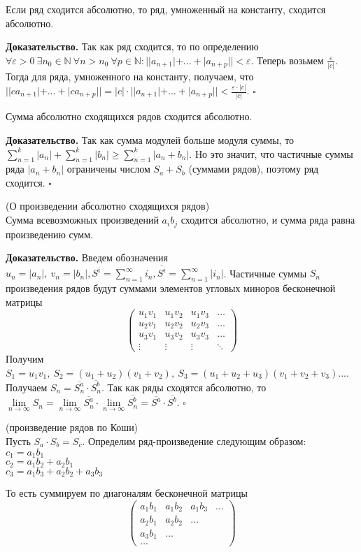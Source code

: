 \begin{theor}
Если ряд сходится абсолютно, то ряд, умноженный на константу, сходится 
абсолютно. 
\end{theor}
\textbf{Доказательство.} 
Так как ряд сходится, то по определению $\forall \varepsilon>0~\exists n_0\in
\mathbb{N}~\forall n>n_0~\forall p\in\mathbb{N}:| |a_{n+1}|+...+|a_{n+p}| |
<\varepsilon$. Теперь возьмем  $\frac{\varepsilon}{|c|}$. Тогда для ряда, 
умноженного на константу, получаем, что $| |ca_{n+1}|+...+|ca_{n+p}| |=
|c|\cdot | |a_{n+1}|+...+|a_{n+p}| |<\frac{\varepsilon\cdot|c|}{|c|}$.  
$\square$ 
\begin{theor}
Сумма абсолютно сходящихся рядов сходится абсолютно.
\end{theor}
\textbf{Доказательство.}  Так как сумма модулей больше модуля суммы, то
$\sum\limits_{n=1}^{k} |a_n|+\sum\limits_{n=1}^{k} |b_n|\geqslant
\sum\limits_{n=1}^{k} |a_n+b_n|$. Но это значит, что частичные суммы 
ряда $|a_n+b_n|$ ограничены числом $S_a+S_b$ (суммами рядов), поэтому ряд
сходится. $\square$ 
\begin{theor}
    (О произведении абсолютно сходящихся рядов)\\
    Сумма всевозможных произведений $a_ib_j$ сходится абсолютно, и сумма ряда
    равна произведению сумм.
\end{theor}
\textbf{Доказательство.} Введем обозначения
$u_n=|a_n|,~v_n=|b_n|,S^i=\sum\limits_{n=1}^{\infty} i_n,\overline{S^i}=
\sum\limits_{n=1}^{\infty} |i_n|$. Частичные суммы $S_n$ произведения рядов
будут суммами элементов угловых миноров бесконечной матрицы
$$
\begin{pmatrix} 
    u_1v_1 & u_1v_2 & u_1v_3 &\ldots\\
    u_2v_1 & u_2v_2 & u_2v_3 &\ldots\\
    u_3v_1 & u_3v_2 & u_3v_3 &\ldots\\
    \vdots & \vdots & \vdots &\ddots
\end{pmatrix} 
$$
Получим
$S_1=u_1v_1,~S_2=(u_1+u_2)(v_1+v_2),~S_3=(u_1+u_2+u_3)(v_1+v_2+v_3)...$.
Получаем $S_n=\overline{S^a_n}\cdot\overline{S^b_n}$. 
Так как ряды сходятся абсолютно,
то $\lim\limits_{n \to \infty} S_n=\lim\limits_{n \to \infty}\overline{S^a_n}
\cdot \lim\limits_{n \to \infty}\overline{S^b_n}=\overline{S^a}\cdot 
\overline{S^b}$. 
$\square$ 
\begin{defin}
    (произведение рядов по Коши)\\
Пусть $S_a\cdot S_b=S_c$. Определим ряд-произведение следующим образом:\\
$c_1=a_1b_1$\\
 $c_2=a_1b_2+a_2b_1$\\
 $c_3=a_1b_3+a_2b_2+a_3b_3$\\
\end{defin}
То есть суммируем по диагоналям бесконечной матрицы
$$
\begin{pmatrix} 
    a_1b_1 & a_1b_2 & a_1b_3 & \ldots\\
    a_2b_1 & a_2b_2 & \ldots & \\
    a_3b_1 & \ldots\\
    \ldots
\end{pmatrix} 
$$

